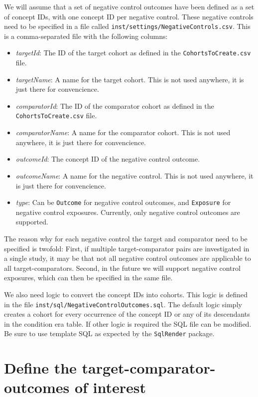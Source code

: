 \documentclass[]{article}
\providecommand{\tightlist}{%
  \setlength{\itemsep}{0pt}\setlength{\parskip}{0pt}}
\begin{document}
We will assume that a set of negative control outcomes have been defined
as a set of concept IDs, with one concept ID per negative control. These
negative controls need to be specified in a file called
\texttt{inst/settings/NegativeControls.csv}. This is a comma-separated
file with the following columns:

\begin{itemize}
\tightlist
\item
  \emph{targetId}: The ID of the target cohort as defined in the
  \texttt{CohortsToCreate.csv} file.
\item
  \emph{targetName}: A name for the target cohort. This is not used
  anywhere, it is just there for convencience.
\item
  \emph{comparatorId}: The ID of the comparator cohort as defined in the
  \texttt{CohortsToCreate.csv} file.
\item
  \emph{comparatorName}: A name for the comparator cohort. This is not
  used anywhere, it is just there for convencience.
\item
  \emph{outcomeId}: The concept ID of the negative control outcome.
\item
  \emph{outcomeName}: A name for the negative control. This is not used
  anywhere, it is just there for convencience.
\item
  \emph{type}: Can be \texttt{Outcome} for negative control outcomes,
  and \texttt{Exposure} for negative control exposures. Currently, only
  negative control outcomes are supported.
\end{itemize}

The reason why for each negative control the target and comparator need
to be specified is twofold: First, if multiple target-comparator pairs
are investigated in a single study, it may be that not all negative
control outcomes are applicable to all target-comparators. Second, in
the future we will support negative control exposures, which can then be
specified in the same file.

We also need logic to convert the concept IDs into cohorts. This logic
is defined in the file \texttt{inst/sql/NegativeControlOutcomes.sql}.
The default logic simply creates a cohort for every occurrence of the
concept ID or any of its descendants in the condition era table. If
other logic is required the SQL file can be modified. Be sure to use
template SQL as expected by the \texttt{SqlRender} package.

\hypertarget{define-the-target-comparator-outcomes-of-interest}{%
\section{Define the target-comparator-outcomes of
interest}\label{define-the-target-comparator-outcomes-of-interest}}
\end{document}
